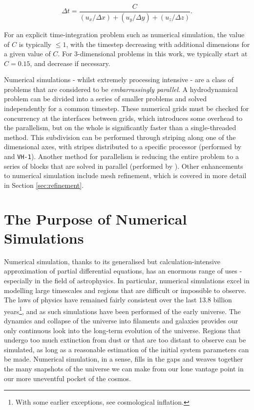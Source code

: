 \begin{equation}
  \Delta t = \frac{C}{(u_x/\Delta x) + (u_y/\Delta y) + (u_z/\Delta z)}.
\end{equation}

\noindent
For an explicit time-integration problem such as numerical simulation, the value of $C$ is typically $\leq 1$, with the timestep decreasing with additional dimensions for a given value of $C$.
For 3-dimensional problems in this work, we typically start at $C = 0.15$, and decrease if necessary.

Numerical simulations - whilst extremely processing intensive - are a class of problems that are considered to be \emph{embarrassingly parallel}.
A hydrodynamical problem can be divided into a series of smaller problems and solved independently for a common timestep.
These numerical grids must be checked for concurrency at the interfaces between grids, which introduces some overhead to the parallelism, but on the whole is significantly faster than a single-threaded method.
This subdivision can be performed through striping along one of the dimensional axes, with stripes distributed to a specific processor (performed by \mg{} and \texttt{VH-1}).
Another method for parallelism is reducing the entire problem to a series of blocks that are solved in parallel (performed by \athena). 
Other enhancements to numerical simulation include mesh refinement, which is covered in more detail in Section \ref{sec:refinement}.

\section{The Purpose of Numerical Simulations}
\label{sec:numerical-purpose}

Numerical simulation, thanks to its generalised but calculation-intensive approximation of partial differential equations, has an enormous range of uses - especially in the field of astrophysics.
In particular, numerical simulations excel in modelling large timescales and regions that are difficult or impossible to observe.
The laws of physics have remained fairly consistent over the last 13.8 billion years\footnote{With some earlier exceptions, see cosmological inflation.}, and as such simulations have been performed of the early universe.
The dynamics and collapse of the universe into filaments and galaxies provides our only continuous look into the long-term evolution of the universe.
Regions that undergo too much extinction from dust or that are too distant to observe can be simulated, as long as a reasonable estimation of the initial system parameters can be made.
Numerical simulation, in a sense, fills in the gaps and weaves together the many snapshots of the universe we can make from our lone vantage point in our more uneventful pocket of the cosmos.

